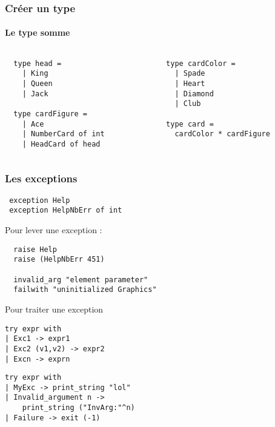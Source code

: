 \begin{frame}[fragile]
	\frametitle{Créer un type}
	\framesubtitle{Le type somme}
	\begin{columns}
		\begin{column}{5cm}
			\begin{lstlisting}
  type head =
    | King
    | Queen
    | Jack

  type cardFigure =
    | Ace
    | NumberCard of int
    | HeadCard of head
			\end{lstlisting}
		\end{column}
		\begin{column}{7cm}
			\begin{lstlisting}
  type cardColor =
    | Spade
    | Heart
    | Diamond
    | Club
  
  type card = 
    cardColor * cardFigure
			\end{lstlisting}
		\end{column}
	\end{columns}
\end{frame}

\begin{frame}[fragile]
	\frametitle{Les exceptions}
	\begin{lstlisting}
 exception Help
 exception HelpNbErr of int
	\end{lstlisting}
	\begin{block}{Pour lever une exception :}
		\begin{lstlisting}
  raise Help
  raise (HelpNbErr 451)
  
  invalid_arg "element parameter"
  failwith "uninitialized Graphics"
		\end{lstlisting}
	\end{block}
	\begin{block}{Pour traiter une exception}
		\begin{center}
			\begin{minipage}{4.2cm}
				\lstset{basicstyle=\scriptsize}
				\begin{lstlisting}
try expr with 
| Exc1 -> expr1
| Exc2 (v1,v2) -> expr2
| Excn -> exprn
				\end{lstlisting}
			\end{minipage}
			\begin{minipage}{5cm}
				\lstset{basicstyle=\scriptsize}
				\begin{lstlisting}
try expr with 
| MyExc -> print_string "lol"
| Invalid_argument n -> 
    print_string ("InvArg:"^n)
| Failure -> exit (-1)
				\end{lstlisting}
			\end{minipage}
		\end{center}
	\end{block}
\end{frame}
